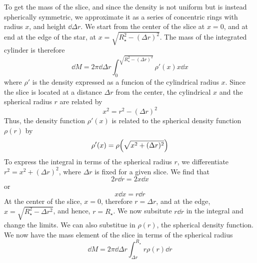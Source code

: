 \documentclass[10pt,a4paper]{article}
\begin{document}
			To get the mass of the slice, and since the density is not uniform but is instead spherically symmetric, we approximate 
			it as a series of concentric rings with radius $x$, and height $\dd{\Delta r}$. We start from the center of the slice at 
			$x=0$, and at end at the edge of the star, at $x = \sqrt{R_\star^2 - (\Delta r)^2}$. The mass of the integrated cylinder 
			is therefore
			\[
				\dd{M} = 2\pi \dd{\Delta r} \int_0^{\sqrt{R_\star^2 - (\Delta r)^2}} \rho'(x) x \dd{x}
			\]
			where $\rho'$ is the density expressed as a funcion of the cylindrical radius $x$. Since the slice is located
			at a distance $\Delta r$ from the center, the cylindrical $x$ and the spherical radius $r$ are related by
			\[
				x^2 = r^2 - (\Delta r)^2
			\]
			Thus, the density function $\rho'(x)$ is related to the spherical density function $\rho(r)$ by
			\[
				\rho'(x) = \rho\qty(\sqrt{x^2 + (\Delta r)^2})
			\]
			To express the integral in terms of the spherical radius $r$, we differentiate $r^2 = x^2 + (\Delta r)^2$, where 
			$\Delta r$ is fixed for a given slice. We find that
			\[
				2r \dd{r} = 2x\dd{x}
			\]
			or
			\[
				x\dd{x} = r\dd{r}
			\]
			At the center of the slice, $x=0$, therefore $r = \Delta r$, and at the edge, $x = \sqrt{R_\star^2 - \Delta r^2}$, and hence, $r = R_\star$.
			We now subsitute $r\dd{r}$ in the integral and change the limits. We can also substitue in $\rho(r)$, the spherical density function. We now have
			the mass element of the slice in terms of the spherical radius
			\[
				\dd{M} = 2\pi \dd{\Delta r} \int_{\Delta r}^{R_\star} r \rho(r)  \dd{r}
			\]
	\label{appendices:a}	
	
	
\end{document}
